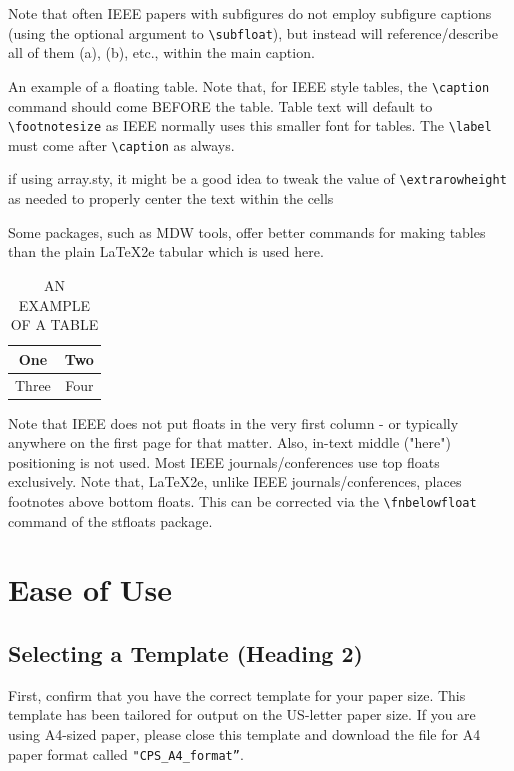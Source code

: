 \documentclass[9pt, conference, a4paper, compsocconf]{IEEEtran}
\begin{document}

Note that often IEEE papers with subfigures do not employ subfigure
captions (using the optional argument to \verb+\subfloat+), but instead will
reference/describe all of them (a), (b), etc., within the main caption.


An example of a floating table. Note that, for IEEE style tables, the
\verb+\caption+ command should come BEFORE the table. Table text will default to
\verb+ \footnotesize+ as IEEE normally uses this smaller font for tables.
 The \verb+\label+ must come after \verb+\caption+ as always.

\begin{table}[!t]
\renewcommand{\arraystretch}{1.3}
 if using array.sty, it might be a good idea to tweak the value of
 \verb+\extrarowheight+ as needed to properly center the text within the cells
\caption{\uppercase{An Example of a Table}}
\label{table_example}
\centering
 Some packages, such as MDW tools, offer better commands for making tables
 than the plain LaTeX2e tabular which is used here.\\
\vspace{0.8em}
\begin{tabular}{|c||c|}
\hline
One & Two\\
\hline
Three & Four\\
\hline
\end{tabular}
\end{table}


 Note that IEEE does not put floats in the very first column - or typically
 anywhere on the first page for that matter. Also, in-text middle ("here")
 positioning is not used. Most IEEE journals/conferences use top floats
 exclusively. Note that, LaTeX2e, unlike IEEE journals/conferences, places
 footnotes above bottom floats. This can be corrected via the \verb+\fnbelowfloat+
 command of the stfloats package.

\section{Ease of Use}
\subsection{Selecting a Template (Heading 2)}
First, confirm that you have the correct template for your paper size. This template has been tailored for output on the US-letter paper size. If you are using A4-sized paper, please close this template and download the file for A4 paper format called \verb+"CPS_A4_format”+.
\end{document}
